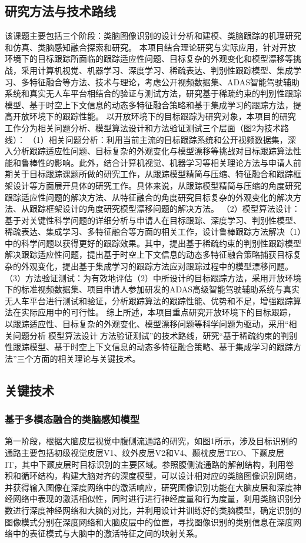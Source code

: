 \documentclass[a4paper,zihao=-4]{article}
\begin{document}
\subsection{研究方法与技术路线}
该课题主要包括三个阶段：类脑图像识别的设计分析和建模、类脑跟踪的机理研究和仿真、类脑感知融合探索和研究。
本项目结合理论研究与实际应用，针对开放环境下的目标跟踪所面临的跟踪适应性问题、目标复杂的外观变化和模型漂移等挑战，采用计算机视觉、机器学习、深度学习、稀疏表达、判别性跟踪模型、集成学习、多特征融合等方法、技术与理论，考虑公开视频数据集、ADAS智能驾驶辅助系统和真实无人车平台相结合的验证与测试方法，研究基于稀疏约束的判别性跟踪模型、基于时空上下文信息的动态多特征融合策略和基于集成学习的跟踪方法，提高开放环境下的跟踪性能。
以开放环境下的目标跟踪为研究对象，本项目的研究工作分为相关问题分析、模型算法设计和方法验证测试三个层面（图2为技术路线）：
（1）相关问题分析：利用当前主流的目标跟踪系统和公开视频数据集，深入分析跟踪适应性问题、目标复杂的外观变化与模型漂移等挑战对目标跟踪算法性能和鲁棒性的影响。此外，结合计算机视觉、机器学习等相关理论方法与申请人前期关于目标跟踪课题所做的研究工作，从跟踪模型精简与压缩、特征融合和跟踪框架设计等方面展开具体的研究工作。具体来说，从跟踪模型精简与压缩的角度研究跟踪适应性问题的解决方法、从特征融合的角度研究目标复杂的外观变化的解决方法、从跟踪框架设计的角度研究模型漂移问题的解决方法。
（2）模型算法设计：基于对关键性科学问题的详细分析与申请人在目标跟踪、深度学习、判别性模型、稀疏表达、集成学习、多特征融合等方面的相关工作，设计鲁棒跟踪方法解决（1）中的科学问题以获得更好的跟踪效果。其中，提出基于稀疏约束的判别性跟踪模型解决跟踪适应性问题，提出基于时空上下文信息的动态多特征融合策略捕获目标复杂的外观变化，提出基于集成学习的跟踪方法应对跟踪过程中的模型漂移问题。
（3）方法验证测试：为有效地评估（2）中所设计的目标跟踪方法，采用开放环境下的标准视频数据集、项目申请人参加研发的ADAS高级智能驾驶辅助系统与真实无人车平台进行测试和验证，分析跟踪算法的跟踪性能、优势和不足，增强跟踪算法在实际应用中的可行性。
综上所述，本项目重点研究开放环境下的目标跟踪，以跟踪适应性、目标复杂的外观变化、模型漂移问题等科学问题为驱动，采用“相关问题分析模型算法设计方法验证测试”的技术路线，研究“基于稀疏约束的判别性跟踪模型、基于时空上下文信息的动态多特征融合策略、基于集成学习的跟踪方法”三个方面的相关理论与关键技术。


\subsection{关键技术}

\subsubsection{基于多模态融合的类脑感知模型}
第一阶段，根据大脑皮层视觉中腹侧流通路的研究，如图1所示，涉及目标识别的通路主要包括初级视觉皮层V1、纹外皮层V2和V4、颞枕皮层TEO、下颞皮层IT，其中下颞皮层时目标识别的主要区域。参照腹侧流通路的解剖结构，利用卷积和循环结构，构建大脑对齐的深度模型，可以设计相对应的类脑图像识别网络，并获得输入图像在深度网络中的激活响应，研究图像识别功能在大脑皮层和深度神经网络中表现的激活相似性，同时进行进行神经度量和行为度量，利用类脑识别分数进行深度神经网络和大脑的对比，并利用设计并训练好的类脑模型，确定识别的图像模式分别在深度网络和大脑皮层中的位置，寻找图像识别的类别信息在深度网络中的表征模式与大脑中的激活特征之间的映射关系。
\end{document}
